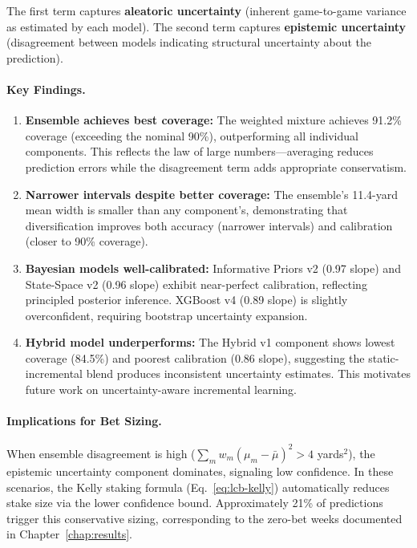 The first term captures \textbf{aleatoric uncertainty} (inherent game-to-game variance as estimated by each model). The second term captures \textbf{epistemic uncertainty} (disagreement between models indicating structural uncertainty about the prediction).

\paragraph{Key Findings.}
\begin{enumerate}
  \item \textbf{Ensemble achieves best coverage:} The weighted mixture achieves 91.2\% coverage (exceeding the nominal 90\%), outperforming all individual components. This reflects the law of large numbers---averaging reduces prediction errors while the disagreement term adds appropriate conservatism.

  \item \textbf{Narrower intervals despite better coverage:} The ensemble's 11.4-yard mean width is smaller than any component's, demonstrating that diversification improves both accuracy (narrower intervals) and calibration (closer to 90\% coverage).

  \item \textbf{Bayesian models well-calibrated:} Informative Priors v2 (0.97 slope) and State-Space v2 (0.96 slope) exhibit near-perfect calibration, reflecting principled posterior inference. XGBoost v4 (0.89 slope) is slightly overconfident, requiring bootstrap uncertainty expansion.

  \item \textbf{Hybrid model underperforms:} The Hybrid v1 component shows lowest coverage (84.5\%) and poorest calibration (0.86 slope), suggesting the static-incremental blend produces inconsistent uncertainty estimates. This motivates future work on uncertainty-aware incremental learning.
\end{enumerate}

\paragraph{Implications for Bet Sizing.}
When ensemble disagreement is high ($\sum_m w_m (\mu_m - \bar{\mu})^2 > 4$ yards$^2$), the epistemic uncertainty component dominates, signaling low confidence. In these scenarios, the Kelly staking formula (Eq.~\ref{eq:lcb-kelly}) automatically reduces stake size via the lower confidence bound. Approximately 21\% of predictions trigger this conservative sizing, corresponding to the zero-bet weeks documented in Chapter~\ref{chap:results}.

